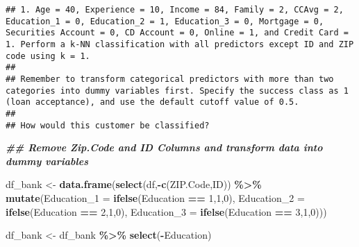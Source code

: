 \documentclass[
]{article}
\newenvironment{Shaded}{\begin{snugshade}}{\end{snugshade}}
\newcommand{\AttributeTok}[1]{\textcolor[rgb]{0.13,0.29,0.53}{#1}}
\newcommand{\ConstantTok}[1]{\textcolor[rgb]{0.56,0.35,0.01}{#1}}
\newcommand{\DecValTok}[1]{\textcolor[rgb]{0.00,0.00,0.81}{#1}}
\newcommand{\DocumentationTok}[1]{\textcolor[rgb]{0.56,0.35,0.01}{\textbf{\textit{#1}}}}
\newcommand{\FloatTok}[1]{\textcolor[rgb]{0.00,0.00,0.81}{#1}}
\newcommand{\FunctionTok}[1]{\textcolor[rgb]{0.13,0.29,0.53}{\textbf{#1}}}
\newcommand{\NormalTok}[1]{#1}
\newcommand{\OtherTok}[1]{\textcolor[rgb]{0.56,0.35,0.01}{#1}}
\newcommand{\SpecialCharTok}[1]{\textcolor[rgb]{0.81,0.36,0.00}{\textbf{#1}}}
\begin{document}
\begin{verbatim}
## 1. Age = 40, Experience = 10, Income = 84, Family = 2, CCAvg = 2, Education_1 = 0, Education_2 = 1, Education_3 = 0, Mortgage = 0, Securities Account = 0, CD Account = 0, Online = 1, and Credit Card = 1. Perform a k-NN classification with all predictors except ID and ZIP code using k = 1. 
## 
## Remember to transform categorical predictors with more than two categories into dummy variables first. Specify the success class as 1 (loan acceptance), and use the default cutoff value of 0.5. 
## 
## How would this customer be classified?
\end{verbatim}

\begin{Shaded}
\begin{Highlighting}[]
\DocumentationTok{\#\# Remove Zip.Code and ID Columns and transform data into dummy variables}

\NormalTok{df\_bank }\OtherTok{\textless{}{-}} \FunctionTok{data.frame}\NormalTok{(}\FunctionTok{select}\NormalTok{(df,}\SpecialCharTok{{-}}\FunctionTok{c}\NormalTok{(ZIP.Code,ID)) }\SpecialCharTok{\%\textgreater{}\%} 
  \FunctionTok{mutate}\NormalTok{(}\AttributeTok{Education\_1 =} \FunctionTok{ifelse}\NormalTok{(Education }\SpecialCharTok{==} \DecValTok{1}\NormalTok{,}\DecValTok{1}\NormalTok{,}\DecValTok{0}\NormalTok{),}
         \AttributeTok{Education\_2 =} \FunctionTok{ifelse}\NormalTok{(Education }\SpecialCharTok{==} \DecValTok{2}\NormalTok{,}\DecValTok{1}\NormalTok{,}\DecValTok{0}\NormalTok{),}
         \AttributeTok{Education\_3 =} \FunctionTok{ifelse}\NormalTok{(Education }\SpecialCharTok{==} \DecValTok{3}\NormalTok{,}\DecValTok{1}\NormalTok{,}\DecValTok{0}\NormalTok{)))}
        
\NormalTok{df\_bank }\OtherTok{\textless{}{-}}\NormalTok{ df\_bank }\SpecialCharTok{\%\textgreater{}\%} \FunctionTok{select}\NormalTok{(}\SpecialCharTok{{-}}\NormalTok{Education)}
\end{Highlighting}
\end{Shaded}

\begin{Shaded}
\end{Shaded}
\end{document}
